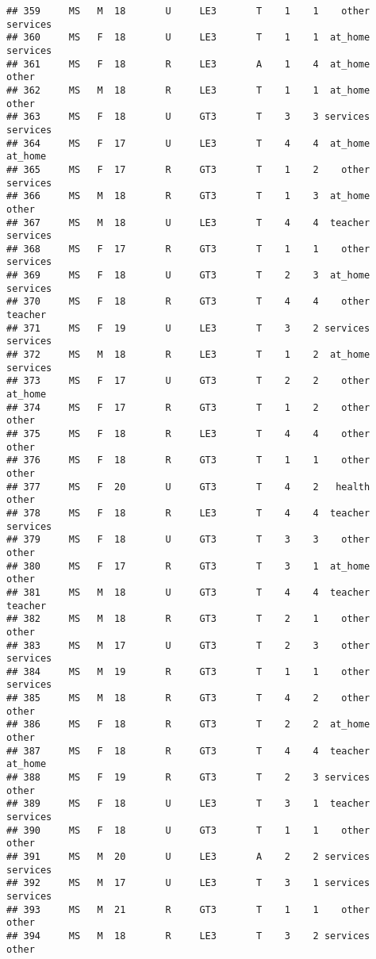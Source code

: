 \documentclass[
]{article}
\begin{document}
\begin{verbatim}
## 359     MS   M  18       U     LE3       T    1    1    other services
## 360     MS   F  18       U     LE3       T    1    1  at_home services
## 361     MS   F  18       R     LE3       A    1    4  at_home    other
## 362     MS   M  18       R     LE3       T    1    1  at_home    other
## 363     MS   F  18       U     GT3       T    3    3 services services
## 364     MS   F  17       U     LE3       T    4    4  at_home  at_home
## 365     MS   F  17       R     GT3       T    1    2    other services
## 366     MS   M  18       R     GT3       T    1    3  at_home    other
## 367     MS   M  18       U     LE3       T    4    4  teacher services
## 368     MS   F  17       R     GT3       T    1    1    other services
## 369     MS   F  18       U     GT3       T    2    3  at_home services
## 370     MS   F  18       R     GT3       T    4    4    other  teacher
## 371     MS   F  19       U     LE3       T    3    2 services services
## 372     MS   M  18       R     LE3       T    1    2  at_home services
## 373     MS   F  17       U     GT3       T    2    2    other  at_home
## 374     MS   F  17       R     GT3       T    1    2    other    other
## 375     MS   F  18       R     LE3       T    4    4    other    other
## 376     MS   F  18       R     GT3       T    1    1    other    other
## 377     MS   F  20       U     GT3       T    4    2   health    other
## 378     MS   F  18       R     LE3       T    4    4  teacher services
## 379     MS   F  18       U     GT3       T    3    3    other    other
## 380     MS   F  17       R     GT3       T    3    1  at_home    other
## 381     MS   M  18       U     GT3       T    4    4  teacher  teacher
## 382     MS   M  18       R     GT3       T    2    1    other    other
## 383     MS   M  17       U     GT3       T    2    3    other services
## 384     MS   M  19       R     GT3       T    1    1    other services
## 385     MS   M  18       R     GT3       T    4    2    other    other
## 386     MS   F  18       R     GT3       T    2    2  at_home    other
## 387     MS   F  18       R     GT3       T    4    4  teacher  at_home
## 388     MS   F  19       R     GT3       T    2    3 services    other
## 389     MS   F  18       U     LE3       T    3    1  teacher services
## 390     MS   F  18       U     GT3       T    1    1    other    other
## 391     MS   M  20       U     LE3       A    2    2 services services
## 392     MS   M  17       U     LE3       T    3    1 services services
## 393     MS   M  21       R     GT3       T    1    1    other    other
## 394     MS   M  18       R     LE3       T    3    2 services    other

\end{verbatim}
\end{document}
